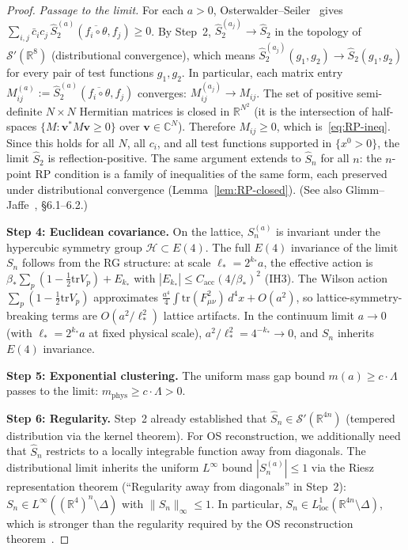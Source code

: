 \documentclass[11pt]{article}
\theoremstyle{definition}
\newcommand{\tr}{\mathrm{tr}}
\newcommand{\R}{\mathbb{R}}
\begin{document}
\begin{proof}
\emph{Passage to the limit.}
For each $a>0$, Osterwalder--Seiler~\cite{OS78} gives
$\sum_{i,j}\bar c_i c_j\,
\hat S_2^{(a)}(\overline{f_i\circ\theta},f_j)\ge 0$.
By Step~2, $\hat S_2^{(a_j)}\to\hat S_2$ in the
topology of $\mathcal{S}'(\R^8)$
(distributional convergence), which means
$\hat S_2^{(a_j)}(g_1,g_2)\to\hat S_2(g_1,g_2)$
for every pair of test functions $g_1,g_2$.
In particular, each matrix entry
$M_{ij}^{(a)}:=\hat S_2^{(a)}
(\overline{f_i\circ\theta},f_j)$
converges: $M_{ij}^{(a_j)}\to M_{ij}$.
The set of positive semi-definite $N\times N$
Hermitian matrices is closed in $\R^{N^2}$
(it is the intersection of half-spaces
$\{M:\mathbf{v}^*M\mathbf{v}\ge 0\}$ over
$\mathbf{v}\in\mathbb{C}^N$).
Therefore $M_{ij}\ge 0$, which is~\eqref{eq:RP-ineq}.
Since this holds for all $N$, all $c_i$, and all test
functions supported in $\{x^0>0\}$, the limit
$\hat S_2$ is reflection-positive.
The same argument extends to $\hat S_n$ for all $n$:
the $n$-point RP condition is a family of inequalities
of the same form, each preserved under distributional
convergence (Lemma~\ref{lem:RP-closed}).
(See also Glimm--Jaffe~\cite{GlimmJaffe}, \S6.1--6.2.)

\textbf{Step 4: Euclidean covariance.}
On the lattice, $S_n^{(a)}$ is invariant under the
hypercubic symmetry group $\mathcal{H}\subset E(4)$.
The full $E(4)$ invariance of the limit $S_n$ follows from
the RG structure: at scale $\ell_*=2^{k_*}a$, the effective
action is $\beta_*\sum_p(1-\frac{1}{2}\tr V_p)+E_{k_*}$
with $|E_{k_*}|\le C_{\mathrm{acc}}(4/\beta_*)^2$ (IH3).
The Wilson action $\sum_p(1-\frac{1}{2}\tr V_p)$ approximates
$\frac{a^4}{4}\int\tr(F_{\mu\nu}^2)\,d^4x+O(a^2)$, so
lattice-symmetry-breaking terms are $O(a^2/\ell_*^2)$
lattice artifacts.  In the continuum limit $a\to 0$
(with $\ell_*=2^{k_*}a$ at fixed physical scale),
$a^2/\ell_*^2=4^{-k_*}\to 0$, and $S_n$ inherits
$E(4)$ invariance.

\textbf{Step 5: Exponential clustering.}
The uniform mass gap bound
$m(a)\ge c\cdot\Lambda$ passes to the limit:
$m_{\mathrm{phys}}\ge c\cdot\Lambda>0$.

\textbf{Step 6: Regularity.}
Step~2 already established that $\hat S_n\in\mathcal{S}'(\R^{4n})$
(tempered distribution via the kernel theorem).
For OS reconstruction, we additionally need that $\hat S_n$
restricts to a locally integrable function away from diagonals.
The distributional limit inherits the uniform $L^\infty$ bound
$|S_n^{(a)}|\le 1$ via the Riesz representation theorem
(``Regularity away from diagonals'' in Step~2):
$S_n\in L^\infty((\R^4)^n\setminus\Delta)$ with
$\|S_n\|_\infty\le 1$.
In particular, $S_n\in L^1_{\mathrm{loc}}(\R^{4n}\setminus\Delta)$,
which is stronger than the regularity required by the OS
reconstruction theorem~\cite{OS73}.
\end{proof}
\end{document}
